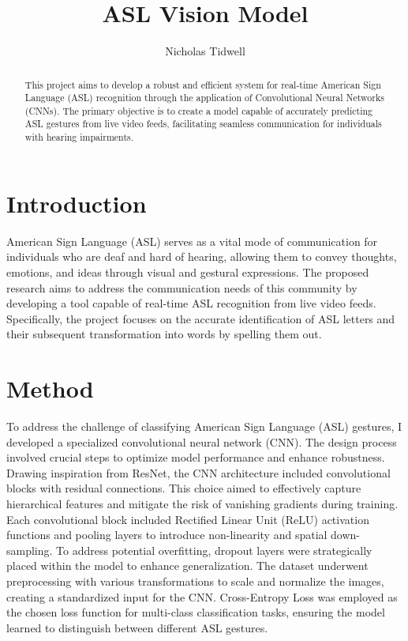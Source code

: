 \documentclass{article}
\title{ ASL Vision Model }
\author{ Nicholas Tidwell }
\begin{document}
\maketitle

\begin{abstract}
This project aims to develop a robust and efficient system for real-time American Sign Language (ASL) recognition through the application of Convolutional Neural Networks (CNNs). The primary objective is to create a model capable of accurately predicting ASL gestures from live video feeds, facilitating seamless communication for individuals with hearing impairments.
\end{abstract}

\section{Introduction}

American Sign Language (ASL) serves as a vital mode of communication for individuals who are deaf and hard of hearing, allowing them to convey thoughts, emotions, and ideas through visual and gestural expressions. The proposed research aims to address the communication needs of this community by developing a tool capable of real-time ASL recognition from live video feeds. Specifically, the project focuses on the accurate identification of ASL letters and their subsequent transformation into words by spelling them out.

\section{Method}
To address the challenge of classifying American Sign Language (ASL) gestures, I developed a specialized convolutional neural network (CNN). The design process involved crucial steps to optimize model performance and enhance robustness. Drawing inspiration from ResNet, the CNN architecture included convolutional blocks with residual connections. This choice aimed to effectively capture hierarchical features and mitigate the risk of vanishing gradients during training. Each convolutional block included Rectified Linear Unit (ReLU) activation functions and pooling layers to introduce non-linearity and spatial down-sampling. To address potential overfitting, dropout layers were strategically placed within the model to enhance generalization. The dataset underwent preprocessing with various transformations to scale and normalize the images, creating a standardized input for the CNN. Cross-Entropy Loss was employed as the chosen loss function for multi-class classification tasks, ensuring the model learned to distinguish between different ASL gestures.
\end{document}
